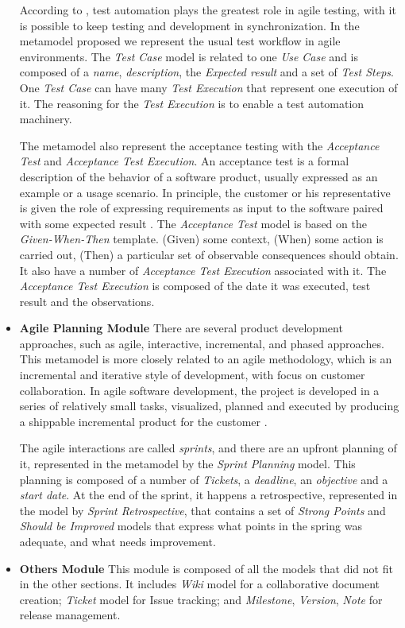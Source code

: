 \begin{itemize}
According to \cite{Shaye2008}, test automation plays the greatest role in agile testing, with it is possible to keep testing and development in synchronization.
In the metamodel proposed we represent the usual test workflow in agile environments. The \textit{Test Case} model is related to one \textit{Use Case} and is composed of a \textit{name}, \textit{description}, the \textit{Expected result} and a set of \textit{Test Steps}. One \textit{Test Case} can have many \textit{Test Execution} that represent one execution of it.  The reasoning for the \textit{Test Execution} is to enable a test automation machinery.

The metamodel also represent the acceptance testing with the \textit{Acceptance Test} and \textit{ Acceptance Test Execution}.  An acceptance test is a formal description of the behavior of a software product, usually expressed as an example or a usage scenario. In principle, the customer or his representative is given the role of expressing requirements as input to the software paired with some expected result \citep{Shaye2008}.  The \textit{Acceptance Test} model is based on the \textit{Given-When-Then} template. (Given) some context, (When) some action is carried out, (Then) a particular set of observable consequences should obtain. It also have a number of \textit{Acceptance Test Execution} associated with it. The \textit{Acceptance Test Execution} is composed of the date it was executed, test result and the observations.

\item  \textbf{ Agile Planning Module }
There are several product development approaches, such as agile, interactive, incremental, and phased approaches. This metamodel is more closely related to an agile methodology, which is an incremental and iterative style of development, with focus on customer collaboration. In agile software development, the project is developed in a series of relatively small tasks, visualized, planned and executed by producing a shippable incremental product for the customer \citep{Uikey2012}.

The agile interactions are called \textit{sprints}, and there are an upfront planning of it, represented in the metamodel by the \textit{Sprint Planning} model. This planning is composed of a number of \textit{Tickets}, a \textit{deadline}, an \textit{objective} and a \textit{start date}. At the end of the sprint, it happens a retrospective, represented in the model by \textit{Sprint Retrospective}, that contains a set of \textit{Strong Points} and \textit{Should be Improved} models that express what points in the spring was adequate, and what needs improvement. 
\item  \textbf{ Others Module }
This module is composed of all the models that did not fit in the other sections. It includes \textit{Wiki} model for a collaborative document creation; \textit{Ticket} model for Issue tracking; and \textit{Milestone}, \textit{Version}, \textit{Note} for release management.

\end{itemize}





